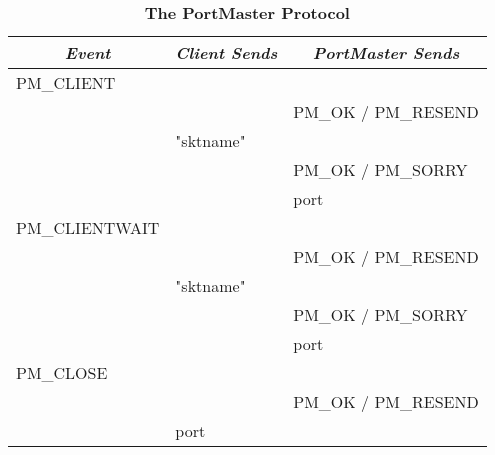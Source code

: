\documentclass[12pt]{article}
\begin{document}
\begin{table}[thb]
  \begin{center}
  \caption{\bf The PortMaster Protocol}
  \vspace{.2in}
  \label{portmaster}
  \begin{tabular}{||l|l|l||} \hline\hline
   \multicolumn{1}{||c|}{\em Event} & \multicolumn{1}{c|}{\em Client Sends} & \multicolumn{1}{c||}{\em PortMaster Sends} \\
   \hline\hline
   {\small PM\_CLIENT}              &                                       &                                            \\
                                    &                                       & {\small PM\_OK / PM\_RESEND}               \\
                                    & "sktname"                             &                                            \\
                                    &                                       & {\small PM\_OK / PM\_SORRY}                \\
                                    &                                       & port                                       \\ \hline
   {\small PM\_CLIENTWAIT}          &                                       &                                            \\
                                    &                                       & {\small PM\_OK / PM\_RESEND}               \\
                                    & "sktname"                             &                                            \\
                                    &                                       & {\small PM\_OK / PM\_SORRY}                \\
                                    &                                       & port                                       \\ \hline
   {\small PM\_CLOSE}               &                                       &                                            \\
                                    &                                       & {\small PM\_OK / PM\_RESEND}               \\
                                    & port                                  &                                            \\

\end{tabular}
\end{center}
\end{table}
\end{document}
